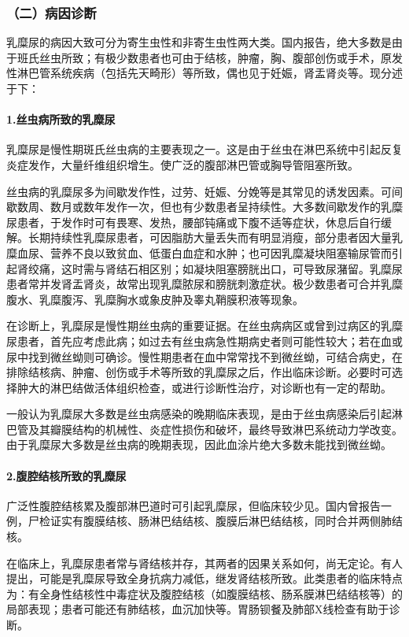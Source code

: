 \subsubsection{（二）病因诊断}

乳糜尿的病因大致可分为寄生虫性和非寄生虫性两大类。国内报告，绝大多数是由于班氏丝虫所致；有极少数患者也可由于结核，肿瘤，胸、腹部创伤或手术，原发性淋巴管系统疾病（包括先天畸形）等所致，偶也见于妊娠，肾盂肾炎等。现分述于下：

\paragraph{1.丝虫病所致的乳糜尿}

乳糜尿是慢性期斑氏丝虫病的主要表现之一。这是由于丝虫在淋巴系统中引起反复炎症发作，大量纤维组织增生。使广泛的腹部淋巴管或胸导管阻塞所致。

丝虫病的乳糜尿多为间歇发作性，过劳、妊娠、分娩等是其常见的诱发因素。可间歇数周、数月或数年发作一次，但也有少数患者呈持续性。大多数间歇发作的乳糜尿患者，于发作时可有畏寒、发热，腰部钝痛或下腹不适等症状，休息后自行缓解。长期持续性乳糜尿患者，可因脂肪大量丢失而有明显消瘦，部分患者因大量乳糜血尿、营养不良以致贫血、低蛋白血症和水肿；也可因乳糜凝块阻塞输尿管而引起肾绞痛，这时需与肾结石相区别；如凝块阻塞膀胱出口，可导致尿潴留。乳糜尿患者常并发肾盂肾炎，故常出现乳糜脓尿和膀胱刺激症状。极少数患者可合并乳糜腹水、乳糜腹泻、乳糜胸水或象皮肿及睾丸鞘膜积液等现象。

在诊断上，乳糜尿是慢性期丝虫病的重要证据。在丝虫病病区或曾到过病区的乳糜尿患者，首先应考虑此病；如过去有丝虫病急性期病史者则可能性较大；若在血或尿中找到微丝蚴则可确诊。慢性期患者在血中常常找不到微丝蚴，可结合病史，在排除结核病、肿瘤、创伤或手术等所致的乳糜尿之后，作出临床诊断。必要时可选择肿大的淋巴结做活体组织检查，或进行诊断性治疗，对诊断也有一定的帮助。

一般认为乳糜尿大多数是丝虫病感染的晚期临床表现，是由于丝虫病感染后引起淋巴管及其瓣膜结构的机械性、炎症性损伤和破坏，最终导致淋巴系统动力学改变。由于乳糜尿大多数是丝虫病的晚期表现，因此血涂片绝大多数未能找到微丝蚴。

\paragraph{2.腹腔结核所致的乳糜尿}

广泛性腹腔结核累及腹部淋巴道时可引起乳糜尿，但临床较少见。国内曾报告一例，尸检证实有腹膜结核、肠淋巴结结核、腹膜后淋巴结结核，同时合并两侧肺结核。

在临床上，乳糜尿患者常与肾结核并存，其两者的因果关系如何，尚无定论。有人提出，可能是乳糜尿导致全身抗病力减低，继发肾结核所致。此类患者的临床特点为：有全身性结核性中毒症状及腹腔结核（如腹膜结核、肠系膜淋巴结结核等）的局部表现；患者可能还有肺结核，血沉加快等。胃肠钡餐及肺部X线检查有助于诊断。

